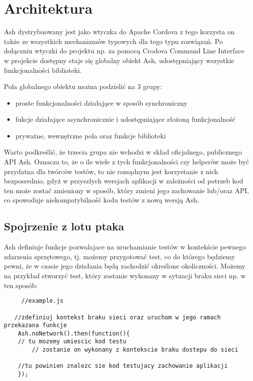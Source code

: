 \documentclass[a4paper]{article}
\begin{document}
\section{Architektura}

Ash dystrybuowany jest jako wtyczka do Apache Cordova z tego korzysta on także ze wszystkich mechanizmów typowych dla tego typu rozwiązań. Po dołączniu wtyczki do projektu np. za pomocą Crodova Command Line Interface w projekcie dostępny staje się globalny obiekt Ash, udostępniający wszystkie funkcjonalności biblioteki. 

Pola globalnego obiektu można podzielić na 3 grupy:  
\begin{itemize}
  \item proste funkcjonalności działające w sposób synchroniczny
  \item fukcje działające asynchronicznie i udostępniające złożoną funkcjonalność 
  \item prywatne, wewnętrzne pola oraz funkcje biblioteki
\end{itemize}
Warto podkreślić, że trzecia grupa nie wchodzi w skład oficjalnego, publicznego API Ash. Oznacza to, że o ile wiele z tych funkcjonalności czy helperów może być przydatna dla twórców testów, to nie rozsądnym jest korzystanie z nich bezposrednio, gdyż w przyszłych wersjach aplikacji w zależności od potrzeb kod ten może zostać zmieniony w sposób, który zmieni jego zachowanie lub/oraz API, co spowoduje niekompatybilność kodu testów z nową wersją Ash.

\subsection{Spojrzenie z lotu ptaka}

Ash definiuje funkcje pozwalajace na uruchamianie testów w kontekście pewnego zdarzenia sprzętowego, tj. możemy przygotować test, co do którego będziemy pewni, że w czasie jego działania będą zachodzić określone okoliczności. Możemy na przykład stworzyć test, który zostanie wykonany w sytuacji braku sieci np. w ten sposób:

\begin{lstlisting}
     //example.js

   //zdefiniuj kontekst braku sieci oraz uruchom w jego ramach przekazana funkcje
    Ash.noNetwork().then(function(){
	// tu mozemy umiescic kod testu
     	// zostanie on wykonany z kontekscie braku dostepu do sieci

	//tu powinien znalezc sie kod testujacy zachowanie aplikacji 
    });
\end{lstlisting}
\end{document}
